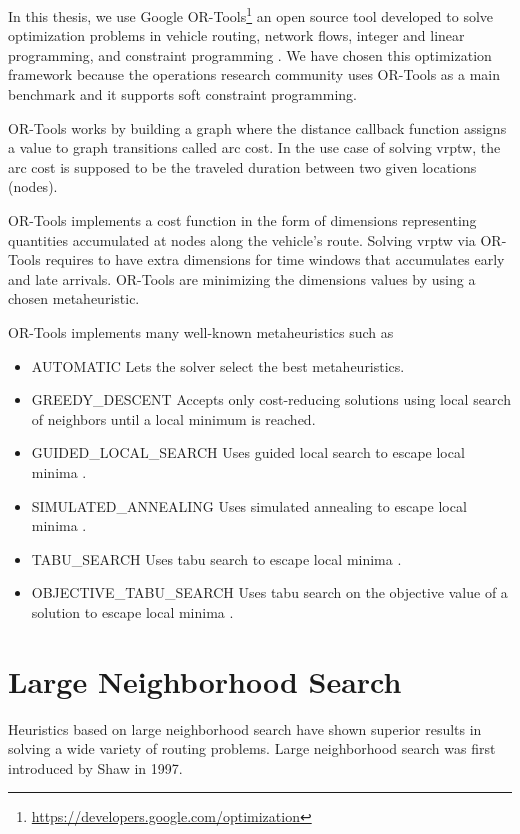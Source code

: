 In this thesis, we use Google OR-Tools\footnote{\url{https://developers.google.com/optimization}} an open source tool developed to solve optimization problems in vehicle routing, network flows, integer and linear programming, and constraint programming \cite{ortools}. We have chosen this optimization framework because the operations research community uses OR-Tools as a main benchmark and it supports soft constraint programming.

OR-Tools works by building a graph where the distance callback function assigns a value to graph transitions called arc cost. In the use case of solving \gls{vrptw}, the arc cost is supposed to be the traveled duration between two given locations (nodes). 

OR-Tools implements a cost function in the form of dimensions representing quantities accumulated at nodes along the vehicle's route. Solving \gls{vrptw} via OR-Tools requires to have extra dimensions for time windows that accumulates early and late arrivals. OR-Tools are minimizing the dimensions values by using a chosen metaheuristic. 

OR-Tools implements many well-known metaheuristics such as
\begin{itemize}
        \item AUTOMATIC Lets the solver select the best metaheuristics.
        \item GREEDY\_DESCENT Accepts only cost-reducing solutions using local search of neighbors until a local minimum is reached.
        \item GUIDED\_LOCAL\_SEARCH Uses guided local search to escape local minima \cite{guided-local-search}.
        \item SIMULATED\_ANNEALING Uses simulated annealing to escape local minima \cite{simulated-annealing}.
        \item TABU\_SEARCH Uses tabu search to escape local minima \cite{tabu-search}.
        \item OBJECTIVE\_TABU\_SEARCH Uses tabu search on the objective value of a solution to escape local minima \cite{objective-tabu-search}.
\end{itemize}

\section{Large Neighborhood Search}\label{lns}
Heuristics based on large neighborhood search have shown superior results in solving a wide variety of routing problems. Large neighborhood search was first introduced by Shaw \cite{shaw-lns} in 1997.

